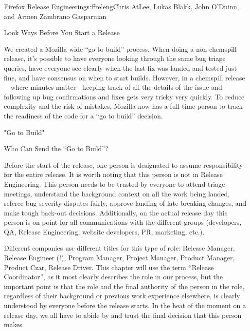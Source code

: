 \begin{aosachapter}{Firefox Release Engineering}{s:ffreleng}{Chris AtLee, Lukas Blakk, John O'Duinn, and Armen Zambrano Gasparnian}
\begin{aosasect1}{Look  Ways Before You Start a Release}
\begin{aosaenumerate}
\item We created a Mozilla-wide ``go to build'' process. When doing a
  non-chemspill release, it's possible to have everyone looking
  through the same bug triage queries, have everyone see clearly when
  the last fix was landed and tested just fine, and have consensus on
  when to start builds. However, in a chemspill release---where
  minutes matter---keeping track of all the details of the issue and
  following up bug confirmations and fixes gets very tricky very
  quickly.  To reduce complexity and the risk of mistakes, Mozilla
  now has a full-time person 
  to track the readiness of the code for a ``go to build''
  decision.  

\end{aosaenumerate}


\end{aosasect1}

\begin{aosasect1}{"Go to Build"}

\begin{aosasect2}{Who Can Send the ``Go to Build''?}

Before the start of the release, one person is designated to assume
responsibility for the entire release. It is worth noting that
this person is not in Release Engineering. This person needs to be
trusted by everyone to attend triage meetings, understand the
background context on all the work being landed, referee bug severity
disputes fairly, approve landing of late-breaking changes, and make
tough back-out decisions.  Additionally, on the actual release day
this person is on point for all communications with the different
groups (developers, QA, Release Engineering, website developers, PR,
marketing, etc.).

Different companies use different titles for this type of role:
Release Manager, Release Engineer (!), Program Manager,
Project Manager, Product Manager, Product Czar, Release Driver. This
chapter will use the term ``Release Coordinator'', as it most clearly
describes the role in our process, but the important point is that the
role and the final authority of the person in the role, regardless of 
their background or previous work experience elsewhere, is clearly understood by
everyone before the release starts. In the heat of the moment on a
release day, we all have to abide by and trust the final decision
that this person makes.


\end{aosasect2}
\end{aosasect1}
\end{aosachapter}
